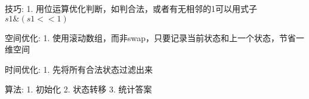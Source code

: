 技巧:
1. 用位运算优化判断，如判合法，或者有无相邻的1可以用式子 $s1\&(s1<<1)$

空间优化:
1. 使用滚动数组，而非swap，只要记录当前状态和上一个状态，节省一维空间

时间优化:
1. 先将所有合法状态过滤出来

算法:
1. 初始化
2. 状态转移
3. 统计答案